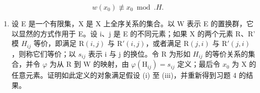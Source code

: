 \[
w (x _ {0}) \not \equiv x _ {0} \bmod . H.
\]

\begin{enumerate}
\def\labelenumi{\alph{enumi})}
\setcounter{enumi}{2}
\tightlist
\item
  设 E 是一个有限集，X 是 X 上全序关系的集合。以 W 表示 E 的置换群，它以显然的方式作用于 E。设 i、j 是 E 的不同元素；如果 X 的两个元素 R、R' 模 \(H_{ij}\) 等价，即满足 \(\mathrm{R}(i,j)\) 与 \(\mathrm{R}'(i,j)\)，或者满足 \(\mathrm{R}(j,i)\) 与 \(\mathrm{R}'(j,i)\)，则称它们等价；以 \(s_{ij}\) 表示 i 与 j 的换位。令 R 为形如 \(H_{ij}\) 的等价关系的集合，并令 \(\varphi\) 为从 R 到 W 的映射，由 \(\varphi(\mathrm{H}_{ij}) = s_{ij}\) 定义；最后令 \(x_{0}\) 为 X 的任意元素。证明如此定义的对象满足假设 (i) 至 (iii)，并重新得到习题 4 的结果。
\end{enumerate}

